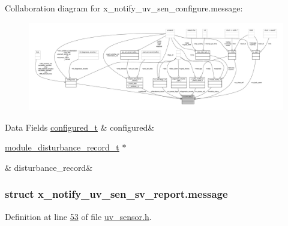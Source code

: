 Collaboration diagram for x\+\_\+notify\+\_\+uv\+\_\+sen\+\_\+configure.\+message\+:\nopagebreak
\begin{figure}[H]
\begin{center}
\leavevmode
\includegraphics[width=350pt]{d8/dce/a01714}
\end{center}
\end{figure}
\begin{DoxyFields}{Data Fields}
\hypertarget{a00020_a48e54afcf03ca45bfe38f6b7ff58764a}{\hyperlink{a00021_d6/d9c/a00352}{configured\+\_\+t}}\label{a00020_a48e54afcf03ca45bfe38f6b7ff58764a}
&
configured&
\\
\hline

\hypertarget{a00020_af7361f7710e5f5389134744aaa60254e}{\hyperlink{a00028}{module\+\_\+disturbance\+\_\+record\+\_\+t} $\ast$}\label{a00020_af7361f7710e5f5389134744aaa60254e}
&
disturbance\+\_\+record&
\\
\hline

\end{DoxyFields}
\label{d3/db2/a00869}
\hypertarget{a00020_d3/db2/a00869}{}
\subsubsection{struct x\+\_\+notify\+\_\+uv\+\_\+sen\+\_\+sv\+\_\+report.\+message}


Definition at line \hyperlink{a00020_source_l00053}{53} of file \hyperlink{a00020_source}{uv\+\_\+sensor.\+h}.



